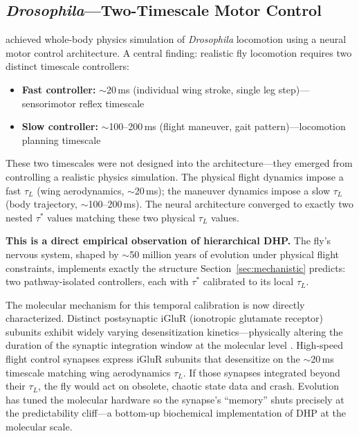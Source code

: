 \documentclass[12pt]{article}
\begin{document}
\subsection{\textit{Drosophila}---Two-Timescale Motor Control}

\citet{vaxenburg2025whole} achieved whole-body physics simulation of \textit{Drosophila}
locomotion using a neural motor control architecture. A central finding: realistic fly
locomotion requires two distinct timescale controllers:
\begin{itemize}
  \item \textbf{Fast controller:} $\sim$20\,ms (individual wing stroke, single leg
        step)---sensorimotor reflex timescale
  \item \textbf{Slow controller:} $\sim$100--200\,ms (flight maneuver, gait
        pattern)---locomotion planning timescale
\end{itemize}

These two timescales were not designed into the architecture---they emerged from controlling
a realistic physics simulation. The physical flight dynamics impose a fast $\tau_L$ (wing
aerodynamics, $\sim$20\,ms); the maneuver dynamics impose a slow $\tau_L$ (body trajectory,
$\sim$100--200\,ms). The neural architecture converged to exactly two nested $\tau^*$ values
matching these two physical $\tau_L$ values.

\textbf{This is a direct empirical observation of hierarchical DHP.} The fly's nervous
system, shaped by $\sim$50 million years of evolution under physical flight constraints,
implements exactly the structure Section~\ref{sec:mechanistic} predicts: two
pathway-isolated controllers, each with $\tau^*$ calibrated to its local $\tau_L$.

The molecular mechanism for this temporal calibration is now directly characterized.
Distinct postsynaptic iGluR (ionotropic glutamate receptor) subunits exhibit widely varying
desensitization kinetics---physically altering the duration of the synaptic integration
window at the molecular level \citep{bhatt2026glutamate}. High-speed flight control synapses
express iGluR subunits that desensitize on the $\sim$20\,ms timescale matching wing
aerodynamics $\tau_L$. If those synapses integrated beyond their $\tau_L$, the fly would act
on obsolete, chaotic state data and crash. Evolution has tuned the molecular hardware so the
synapse's ``memory'' shuts precisely at the predictability cliff---a bottom-up biochemical
implementation of DHP at the molecular scale.
\end{document}
